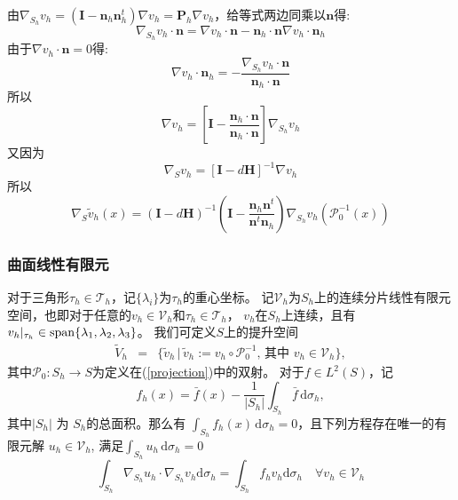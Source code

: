 由$\nabla_{S_h}v_h=(\boldsymbol{I}-\boldsymbol{n}_h\boldsymbol{n}_h^t)\nabla v_h=\boldsymbol{P}_h\nabla v_h$，给等式两边同乘以$\boldsymbol{n}$得:
\begin{equation*}
\nabla_{S_h}v_h\cdot\boldsymbol{n}=\nabla v_h\cdot\boldsymbol{n}-\boldsymbol{n}_h\cdot\boldsymbol{n}\nabla v_h\cdot\boldsymbol{n}_h
\end{equation*}
由于$\nabla v_h\cdot\boldsymbol{n}=0$得:
\begin{equation*}
\nabla v_h\cdot\boldsymbol{n}_h=-\frac{\nabla_{S_h}v_h\cdot\boldsymbol{n}}{\boldsymbol{n}_h\cdot\boldsymbol{n}}
\end{equation*}
所以
\begin{equation*}
\nabla v_h=\left[\boldsymbol{I}-\frac{\boldsymbol{n}_h\cdot\boldsymbol{n}}{\boldsymbol{n}_h\cdot\boldsymbol{n}}\right]\nabla_{S_h}v_h
\end{equation*}
又因为
\begin{equation*}
\nabla_Sv_h=[\boldsymbol{I}-d\boldsymbol{H}]^{-1}\nabla v_h 
\end{equation*}
所以
\begin{equation*}
\nabla_{S}\tilde{v}_h(x)=(\boldsymbol{I}-d\boldsymbol{H})^{-1}\left(\boldsymbol{I}-\frac{\boldsymbol{n}_h\boldsymbol{n}^t}{\boldsymbol{n}^t\boldsymbol{n}_h}\right)\nabla_{S_h}v_h(\mathcal{P}^{-1}_0(x))
\end{equation*}

\subsubsection{曲面线性有限元}
对于三角形$\tau_h\in\mathcal{T}_h$，记$\{\lambda_i\}$为$\tau_h$的重心坐标。   
记$\mathcal V_h$为$S_h$上的连续分片线性有限元空间，也即对于任意的$v_h\in \mathcal V_h$和$\tau_h \in \mathcal T_h$，
$v_h$在$S_h$上连续，且有$v_h|_{\tau_h}\in {\rm span}\{\lambda_1,\lambda_2,\lambda_3\}$。  
我们可定义$S$上的提升空间
\begin{eqnarray*}
 \tilde{V}_{h} & = &
\{\tilde{v}_{h} \, | \, \tilde{v}_{h}:=v_{h}\circ\mathcal{P}_{0}^{-1},\,
\text{其中 }v_{h}\in \mathcal V_h\},
\end{eqnarray*}
其中$\mathcal P_0: S_h \to S$为定义在(\ref{projection})中的双射。
对于$f\in L^{2}(S)$，记
\begin{equation}\label{eq:fh}
f_{h}(x)=\bar{f}(x)-\frac{1}{|S_{h}|}\int_{S_{h}} \bar f \, \mathrm{d}\sigma_{h},
\end{equation}
其中$|S_{h}|$ 为 $ S_{h}$的总面积。那么有
$\int_{S_{h}}f_{h}(x)\,\mathrm{d}\sigma_{h}=0$，且下列方程存在唯一的有限元解
$u_{h}\in \mathcal V_h$, 满足$\int_{S_{h}}u_{h}\,\mathrm{d}\sigma_{h}=0$
\begin{equation}
\int_{S_h}\nabla_{S_h}u_h\cdot\nabla_{S_h}v_h\mathrm{d}\sigma_h=\int_{S_h}f_hv_h\mathrm{d}\sigma_h\quad\forall v_h\in\mathcal{V}_h
\end{equation}


